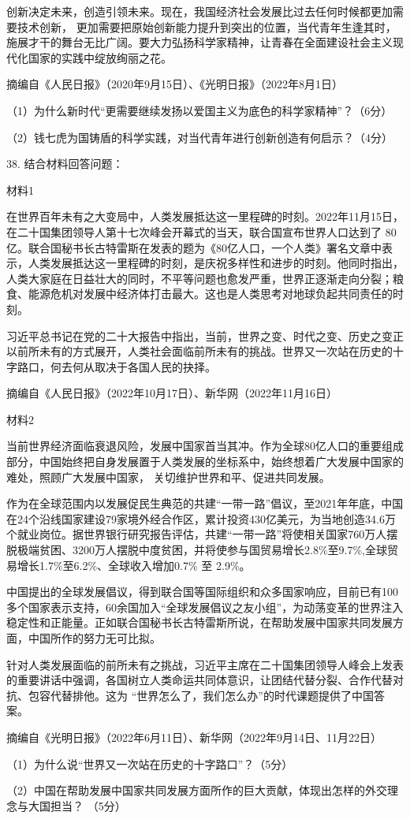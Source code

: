 \documentclass[UTF8,11pt]{ctexart}
\begin{document}
创新决定未来，创造引领未来。现在，我国经济社会发展比过去任何时候都更加需要技术创新， 更加需要把原始创新能力提升到突出的位置，当代青年生逢其时，施展才干的舞台无比广阔。要大力弘扬科学家精神，让青春在全面建设社会主义现代化国家的实践中绽放绚丽之花。

摘编自《人民日报》（2020年9月15日）、《光明日报》（2022年8月1日）

（1）为什么新时代“更需要继续发扬以爱国主义为底色的科学家精神”？（6分）

（2）钱七虎为国铸盾的科学实践，对当代青年进行创新创造有何启示？（4分）

38. 结合材料回答问题：

材料1

在世界百年未有之大变局中，人类发展抵达这一里程碑的时刻。2022年11月15日，在二十国集团领导人第十七次峰会开幕式的当天，联合国宣布世界人口达到了 80亿。联合国秘书长古特雷斯在发表的题为《80亿人口，一个人类》署名文章中表示，人类发展抵达这一里程碑的时刻，是庆祝多样性和进步的时刻。他同时指出，人类大家庭在日益壮大的同时，不平等问题也愈发严重，世界正逐渐走向分裂；粮食、能源危机对发展中经济体打击最大。这也是人类思考对地球负起共同责任的时刻。

习近平总书记在党的二十大报告中指出，当前，世界之变、时代之变、历史之变正以前所未有的方式展开，人类社会面临前所未有的挑战。世界又一次站在历史的十字路口，何去何从取决于各国人民的抉择。

摘编自《人民日报》（2022年10月17日）、新华网（2022年11月16日）

材料2

当前世界经济面临衰退风险，发展中国家首当其冲。作为全球80亿人口的重要组成部分，中国始终把自身发展置于人类发展的坐标系中，始终想着广大发展中国家的难处，照顾广大发展中国家， 关切维护世界和平、促进共同发展。

作为在全球范围内以发展促民生典范的共建“一带一路”倡议，至2021年年底，中国在24个沿线国家建设79家境外经合作区，累计投资430亿美元，为当地创造34.6万个就业岗位。据世界银行研究报告评估，共建“一带一路”将使相关国家760万人摆脱极端贫困、3200万人摆脱中度贫困，并将使参与国贸易增长2.8\%至9.7\%,全球贸易增长1.7\%至6.2\%、全球收入增加0.7\% 至 2.9\%。

中国提出的全球发展倡议，得到联合国等国际组织和众多国家响应，目前已有100多个国家表示支持，60余国加入“全球发展倡议之友小组”，为动荡变革的世界注入稳定性和正能量。正如联合国秘书长古特雷斯所说，在帮助发展中国家共同发展方面，中国所作的努力无可比拟。

针对人类发展面临的前所未有之挑战，习近平主席在二十国集团领导人峰会上发表的重要讲话中强调，各国树立人类命运共同体意识，让团结代替分裂、合作代替对抗、包容代替排他。这为 “世界怎么了，我们怎么办”的时代课题提供了中国答案。

摘编自《光明日报》（2022年6月11日）、新华网（2022年9月14日、11月22日）

（1）为什么说“世界又一次站在历史的十字路口”？（5分）

（2）中国在帮助发展中国家共同发展方面所作的巨大贡献，体现出怎样的外交理念与大国担当？ （5分）
\end{document}
